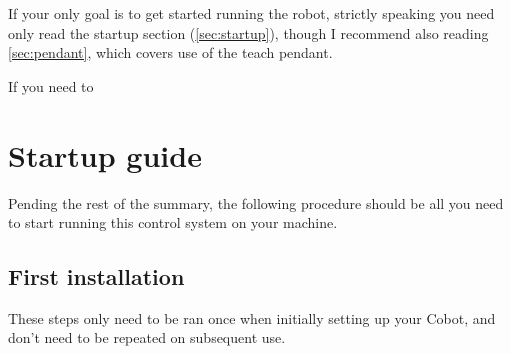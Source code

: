 \documentclass[11pt]{article}
\begin{document}
If your only goal is to get started running the robot, strictly speaking you need only read the startup section (\autoref{sec:startup}), though I recommend also reading \autoref{sec:pendant}, which covers use of the teach pendant.

If you need to 

\section{Startup guide}\label{sec:startup}
Pending the rest of the summary, the following procedure should be all you need to start running this control system on your machine.
\subsection{First installation}
These steps only need to be ran once when initially setting up your Cobot, and don't need to be repeated on subsequent use.
\end{document}
